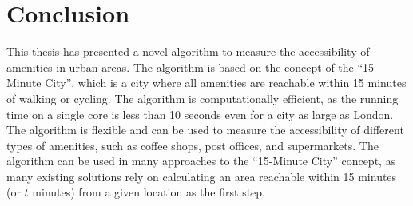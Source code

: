 \chapter{Conclusion} \label{conclusion}

This thesis has presented a novel algorithm to measure the accessibility of amenities in urban areas. The algorithm is based on the concept of the ``15-Minute City'', which is a city where all amenities are reachable within 15 minutes of walking or cycling. The algorithm is computationally efficient, as the running time on a single core is less than 10 seconds even for a city as large as London. The algorithm is flexible and can be used to measure the accessibility of different types of amenities, such as coffee shops, post offices, and supermarkets. The algorithm can be used in many approaches to the ``15-Minute City'' concept, as many existing solutions rely on calculating an area reachable within 15 minutes (or $t$ minutes) from a given location as the first step.

